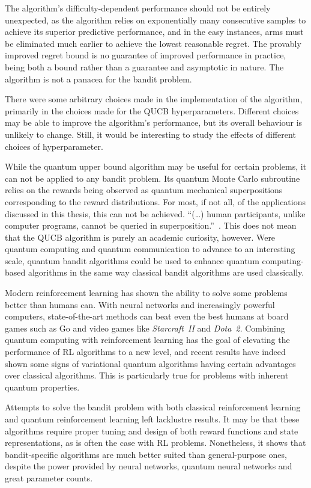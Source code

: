 The algorithm's difficulty-dependent performance should not be entirely unexpected, as the algorithm relies on exponentially many consecutive samples to achieve its superior predictive performance, and in the easy instances, arms must be eliminated much earlier to achieve the lowest reasonable regret.
The provably improved regret bound is no guarantee of improved performance in practice, being both a bound rather than a guarantee and asymptotic in nature.
The algorithm is not a panacea for the bandit problem.

There were some arbitrary choices made in the implementation of the algorithm, primarily in the choices made for the QUCB hyperparameters.
Different choices may be able to improve the algorithm's performance, but its overall behaviour is unlikely to change.
Still, it would be interesting to study the effects of different choices of hyperparameter.

While the quantum upper bound algorithm may be useful for certain problems, it can not be applied to any bandit problem.
Its quantum Monte Carlo subroutine relies on the rewards being observed as quantum mechanical superpositions corresponding to the reward distributions.
For most, if not all, of the applications discussed in this thesis, this can not be achieved.
\enquote{(\dots) human participants, unlike computer programs, cannot be queried in superposition.}~\autocite{wang2021}.
This does not mean that the QUCB algorithm is purely an academic curiosity, however.
Were quantum computing and quantum communication to advance to an interesting scale, quantum bandit algorithms could be used to enhance quantum computing-based algorithms in the same way classical bandit algorithms are used classically.

Modern reinforcement learning has shown the ability to solve some problems better than humans can.
With neural networks and increasingly powerful computers, state-of-the-art methods can beat even the best humans at board games such as Go and video games like \textit{Starcraft~II} and \textit{Dota~2}.
Combining quantum computing with reinforcement learning has the goal of elevating the performance of RL algorithms to a new level, and recent results have indeed shown some signs of variational quantum algorithms having certain advantages over classical algorithms.
This is particularly true for problems with inherent quantum properties.

Attempts to solve the bandit problem with both classical reinforcement learning and quantum reinforcement learning left lacklustre results.
It may be that these algorithms require proper tuning and design of both reward functions and state representations, as is often the case with RL problems.
Nonetheless, it shows that bandit-specific algorithms are much better suited than general-purpose ones, despite the power provided by neural networks, quantum neural networks and great parameter counts.

